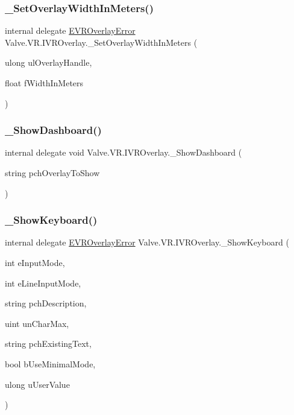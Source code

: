 \subsubsection{\texorpdfstring{\_SetOverlayWidthInMeters()}{\_SetOverlayWidthInMeters()}}
{\footnotesize\ttfamily internal delegate \mbox{\hyperlink{namespace_valve_1_1_v_r_aaee5c5144f42b7969d45b854f51b0c18}{E\+V\+R\+Overlay\+Error}} Valve.\+V\+R.\+I\+V\+R\+Overlay.\+\_\+\+Set\+Overlay\+Width\+In\+Meters (\begin{DoxyParamCaption}\item[{ulong}]{ul\+Overlay\+Handle,  }\item[{float}]{f\+Width\+In\+Meters }\end{DoxyParamCaption})}

\mbox{\label{struct_valve_1_1_v_r_1_1_i_v_r_overlay_ab4a713cf43946bbc014316ba20c21a3e}} 
\subsubsection{\texorpdfstring{\_ShowDashboard()}{\_ShowDashboard()}}
{\footnotesize\ttfamily internal delegate void Valve.\+V\+R.\+I\+V\+R\+Overlay.\+\_\+\+Show\+Dashboard (\begin{DoxyParamCaption}\item[{string}]{pch\+Overlay\+To\+Show }\end{DoxyParamCaption})}

\mbox{\label{struct_valve_1_1_v_r_1_1_i_v_r_overlay_a3f0da6da79c2932b9619f74f119f24f5}} 
\subsubsection{\texorpdfstring{\_ShowKeyboard()}{\_ShowKeyboard()}}
{\footnotesize\ttfamily internal delegate \mbox{\hyperlink{namespace_valve_1_1_v_r_aaee5c5144f42b7969d45b854f51b0c18}{E\+V\+R\+Overlay\+Error}} Valve.\+V\+R.\+I\+V\+R\+Overlay.\+\_\+\+Show\+Keyboard (\begin{DoxyParamCaption}\item[{int}]{e\+Input\+Mode,  }\item[{int}]{e\+Line\+Input\+Mode,  }\item[{string}]{pch\+Description,  }\item[{uint}]{un\+Char\+Max,  }\item[{string}]{pch\+Existing\+Text,  }\item[{bool}]{b\+Use\+Minimal\+Mode,  }\item[{ulong}]{u\+User\+Value }\end{DoxyParamCaption})}

